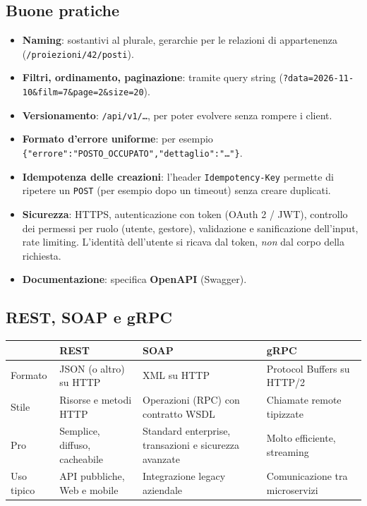 \subsection{Buone pratiche}
\begin{itemize}
    \item \textbf{Naming}: sostantivi al plurale, gerarchie per le relazioni di appartenenza (\texttt{/proiezioni\allowbreak/42\allowbreak/posti}).
    \item \textbf{Filtri, ordinamento, paginazione}: tramite query string (\texttt{?data=2026-11-10\&\allowbreak film=7\&\allowbreak page=2\&\allowbreak size=20}).
    \item \textbf{Versionamento}: \texttt{/api/v1/\ldots}, per poter evolvere senza rompere i client.
    \item \textbf{Formato d'errore uniforme}: per esempio \texttt{\{"errore":\allowbreak "POSTO\_OCCUPATO",\allowbreak "dettaglio":\allowbreak "\ldots"\}}.
    \item \textbf{Idempotenza delle creazioni}: l'header \texttt{Idempotency-Key} permette di ripetere un \texttt{POST} (per esempio dopo un timeout) senza creare duplicati.
    \item \textbf{Sicurezza}: HTTPS, autenticazione con token (OAuth 2 / JWT), controllo dei permessi per ruolo (utente, gestore), validazione e sanificazione dell'input, rate limiting. L'identità dell'utente si ricava dal token, \emph{non} dal corpo della richiesta.
    \item \textbf{Documentazione}: specifica \textbf{OpenAPI} (Swagger).
\end{itemize}

\subsection{REST, SOAP e gRPC}
\begin{center}
\small
\begin{tabularx}{\textwidth}{@{}lXXX@{}}
\toprule
 & \textbf{REST} & \textbf{SOAP} & \textbf{gRPC} \\
\midrule
Formato & JSON (o altro) su HTTP & XML su HTTP & Protocol Buffers su HTTP/2 \\
Stile & Risorse e metodi HTTP & Operazioni (RPC) con contratto WSDL & Chiamate remote tipizzate \\
Pro & Semplice, diffuso, cacheabile & Standard enterprise, transazioni e sicurezza avanzate & Molto efficiente, streaming \\
Uso tipico & API pubbliche, Web e mobile & Integrazione legacy aziendale & Comunicazione tra microservizi \\
\bottomrule
\end{tabularx}
\end{center}

